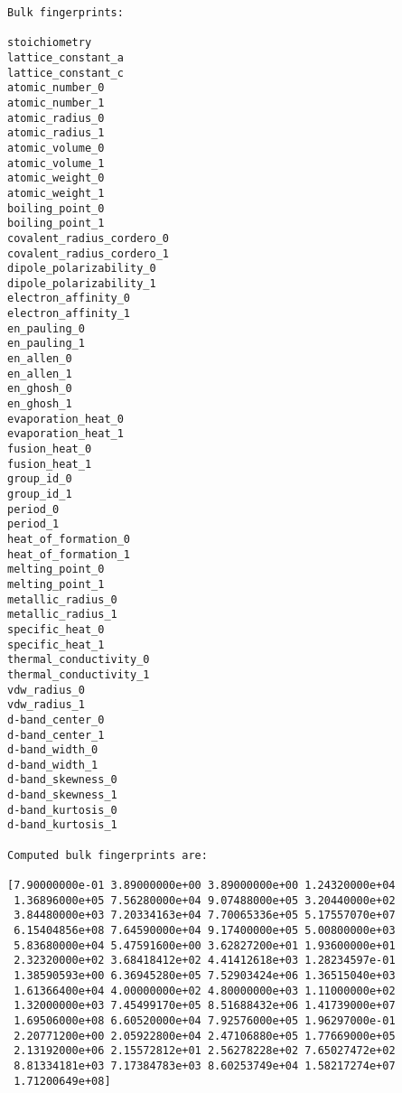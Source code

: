 \documentclass[11pt]{article}
\begin{document}
\begin{verbatim}
Bulk fingerprints:

stoichiometry
lattice_constant_a
lattice_constant_c
atomic_number_0
atomic_number_1
atomic_radius_0
atomic_radius_1
atomic_volume_0
atomic_volume_1
atomic_weight_0
atomic_weight_1
boiling_point_0
boiling_point_1
covalent_radius_cordero_0
covalent_radius_cordero_1
dipole_polarizability_0
dipole_polarizability_1
electron_affinity_0
electron_affinity_1
en_pauling_0
en_pauling_1
en_allen_0
en_allen_1
en_ghosh_0
en_ghosh_1
evaporation_heat_0
evaporation_heat_1
fusion_heat_0
fusion_heat_1
group_id_0
group_id_1
period_0
period_1
heat_of_formation_0
heat_of_formation_1
melting_point_0
melting_point_1
metallic_radius_0
metallic_radius_1
specific_heat_0
specific_heat_1
thermal_conductivity_0
thermal_conductivity_1
vdw_radius_0
vdw_radius_1
d-band_center_0
d-band_center_1
d-band_width_0
d-band_width_1
d-band_skewness_0
d-band_skewness_1
d-band_kurtosis_0
d-band_kurtosis_1

Computed bulk fingerprints are:

[7.90000000e-01 3.89000000e+00 3.89000000e+00 1.24320000e+04
 1.36896000e+05 7.56280000e+04 9.07488000e+05 3.20440000e+02
 3.84480000e+03 7.20334163e+04 7.70065336e+05 5.17557070e+07
 6.15404856e+08 7.64590000e+04 9.17400000e+05 5.00800000e+03
 5.83680000e+04 5.47591600e+00 3.62827200e+01 1.93600000e+01
 2.32320000e+02 3.68418412e+02 4.41412618e+03 1.28234597e-01
 1.38590593e+00 6.36945280e+05 7.52903424e+06 1.36515040e+03
 1.61366400e+04 4.00000000e+02 4.80000000e+03 1.11000000e+02
 1.32000000e+03 7.45499170e+05 8.51688432e+06 1.41739000e+07
 1.69506000e+08 6.60520000e+04 7.92576000e+05 1.96297000e-01
 2.20771200e+00 2.05922800e+04 2.47106880e+05 1.77669000e+05
 2.13192000e+06 2.15572812e+01 2.56278228e+02 7.65027472e+02
 8.81334181e+03 7.17384783e+03 8.60253749e+04 1.58217274e+07
 1.71200649e+08]
\end{verbatim}
\end{document}
